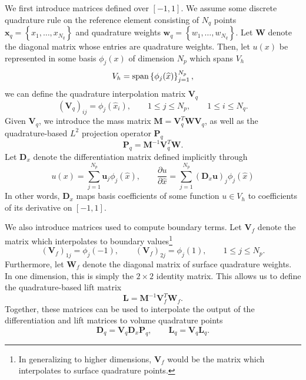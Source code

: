 \documentclass[preprint,10pt]{article}
\theoremstyle{definition}
\theoremstyle{lemma}
\theoremstyle{theorem}
\theoremstyle{assumption}
\newcommand{\pd}[2]{\frac{\partial#1}{\partial#2}}
\newcommand{\LRp}[1]{\left( #1 \right)}
\newcommand{\LRc}[1]{\left\{ #1 \right\}}
\begin{document}
We first introduce matrices defined over $[-1,1]$.  We assume some discrete quadrature rule on the reference element consisting of $N_q$ points ${\bm{x}}_q = \LRc{{x}_1,\ldots,{x}_{N_q}}$ and quadrature weights $\bm{w}_q = \LRc{w_1,\ldots,w_{N_q}}$.  Let $\bm{W}$ denote the diagonal matrix whose entries are quadrature weights. Then, let $u(x)$ be represented in some basis $\phi_j(x)$ of dimension $N_p$ which spans $V_h$
\[
V_h = {\rm span}\LRc{\phi_j(\widehat{x})}_{j=1}^{N_p},
\]
we can define the quadrature interpolation matrix $\bm{V}_q$
\[
\LRp{\bm{V}_q}_{ij} = \phi_j(\widehat{x}_i), \qquad 1 \leq j \leq N_p, \qquad 1 \leq i \leq N_q.  
\]
Given $\bm{V}_q$, we introduce the mass matrix $\bm{M} = \bm{V}_q^T\bm{W}\bm{V}_q$, as well as the quadrature-based $L^2$ projection operator $\bm{P}_q$
\[
\bm{P}_q = \bm{M}^{-1}\bm{V}_q^T\bm{W}.
\]
Let $\bm{D}_x$ denote the differentiation matrix defined implicitly through
\[
u(x) = \sum_{j=1}^{N_p} \bm{u}_j \phi_j(\widehat{x}), \qquad \pd{u}{\widehat{x}} = \sum_{j=1}^{N_p} \LRp{\bm{D}_x \bm{u}}_j\phi_j(\widehat{x})
\]
In other words, $\bm{D}_x$ maps basis coefficients of some function $u \in V_h$ to coefficients of its derivative on $[-1,1]$.  

We also introduce matrices used to compute boundary terms.  Let $\bm{V}_f$ denote the matrix which interpolates to boundary values\footnote{In generalizing to higher dimensions, $\bm{V}_f$ would be the matrix which interpolates to surface quadrature points.}
\[
\LRp{\bm{V}_f}_{1j} = \phi_j(-1), \qquad \LRp{\bm{V}_f}_{2j} = \phi_j(1), \qquad 1 \leq j \leq N_p.  
\]
Furthermore, let $\bm{W}_f$ denote the diagonal matrix of surface quadrature weights.  In one dimension, this is simply the $2\times 2$ identity matrix.  This allows us to define the quadrature-based lift matrix 
\[
\bm{L} = \bm{M}^{-1}\bm{V}_f^T \bm{W}_f.
\]
Together, these matrices can be used to interpolate the output of the differentiation and lift matrices to volume quadrature points
\[
\bm{D}_q = \bm{V}_q \bm{D}_x \bm{P}_q, \qquad \bm{L}_q = \bm{V}_q\bm{L}_q.
\]
\end{document}
